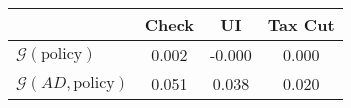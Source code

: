 \begin{tabular}{@{}lccc@{}}
\toprule
                          & Check      & UI    & Tax Cut    \\  \midrule
$\mathcal{G}(\text{policy})$ & 0.002  & -0.000  & 0.000     \\
$\mathcal{G}(AD,\text{policy})$ & 0.051  & 0.038  & 0.020     \\
\end{tabular}
